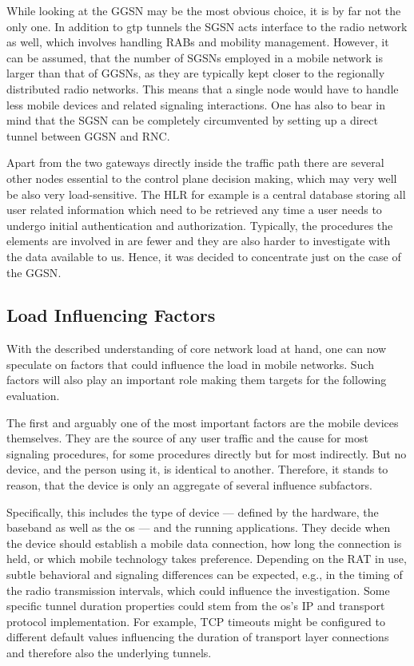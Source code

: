 While looking at the \gls{GGSN} may be the most obvious choice, it is by far not the only one. In addition to \gls{gtp} tunnels the \gls{SGSN} acts interface to the radio network as well, which involves handling \glspl{RAB} and mobility management. However, it can be assumed, that the number of \glspl{SGSN} employed in a mobile network is larger than that of \glspl{GGSN}, as they are typically kept closer to the regionally distributed radio networks. This means that a single node would have to handle less mobile devices and related signaling interactions. One has also to bear in mind that the \gls{SGSN} can be completely circumvented by setting up a direct tunnel between \gls{GGSN} and \gls{RNC}.

Apart from the two gateways directly inside the traffic path there are several other nodes essential to the control plane decision making, which may very well be also very load-sensitive. The \gls{HLR} for example is a central database storing all user related information which need to be retrieved any time a user needs to undergo initial authentication and authorization. Typically, the procedures the elements are involved in are fewer and they are also harder to investigate with the data available to us. Hence, it was decided to concentrate just on the case of the \gls{GGSN}.


\subsection{Load Influencing Factors}

With the described understanding of core network load at hand, one can now speculate on factors that could influence the load in mobile networks. Such factors will also play an important role making them targets for the following evaluation.

The first and arguably one of the most important factors are the mobile devices themselves. They are the source of any user traffic and the cause for most signaling procedures, for some procedures directly but for most indirectly. But no device, and the person using it, is identical to another. Therefore, it stands to reason, that the device is only an aggregate of several influence subfactors.

Specifically, this includes the type of device --- defined by the hardware, the baseband as well as the \gls{os} --- and the running applications. They decide when the device should establish a mobile data connection, how long the connection is held, or which mobile technology takes preference. Depending on the \gls{RAT} in use, subtle behavioral and signaling differences can be expected, e.g., in the timing of the radio transmission intervals, which could influence the investigation. Some specific tunnel duration properties could stem from the \gls{os}'s \gls{IP} and transport protocol implementation. For example, \gls{TCP} timeouts might be configured to different default values influencing the duration of transport layer connections and therefore also the underlying tunnels.

